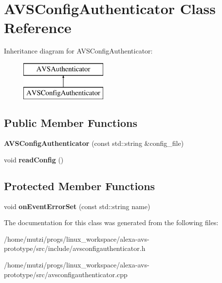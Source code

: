 \hypertarget{classAVSConfigAuthenticator}{}\section{A\+V\+S\+Config\+Authenticator Class Reference}
\label{classAVSConfigAuthenticator}
Inheritance diagram for A\+V\+S\+Config\+Authenticator\+:\begin{figure}[H]
\begin{center}
\leavevmode
\includegraphics[height=2.000000cm]{d0/da2/classAVSConfigAuthenticator}
\end{center}
\end{figure}
\subsection*{Public Member Functions}
\begin{DoxyCompactItemize}
\item 
\mbox{\label{classAVSConfigAuthenticator_a4034cc73e6d7540b47635b0e0bd23dcc}} 
{\bfseries A\+V\+S\+Config\+Authenticator} (const std\+::string \&config\+\_\+file)
\item 
\mbox{\label{classAVSConfigAuthenticator_ad3e1966ff0a56c3ccb38c0ae82db4767}} 
void {\bfseries read\+Config} ()
\end{DoxyCompactItemize}
\subsection*{Protected Member Functions}
\begin{DoxyCompactItemize}
\item 
\mbox{\label{classAVSConfigAuthenticator_a4c2cd0d9123ece1cb738f2d69d12728e}} 
void {\bfseries on\+Event\+Error\+Set} (const std\+::string name)
\end{DoxyCompactItemize}


The documentation for this class was generated from the following files\+:\begin{DoxyCompactItemize}
\item 
/home/mutzi/progs/linux\+\_\+workspace/alexa-\/avs-\/prototype/src/include/avsconfigauthenticator.\+h\item 
/home/mutzi/progs/linux\+\_\+workspace/alexa-\/avs-\/prototype/src/avsconfigauthenticator.\+cpp\end{DoxyCompactItemize}
